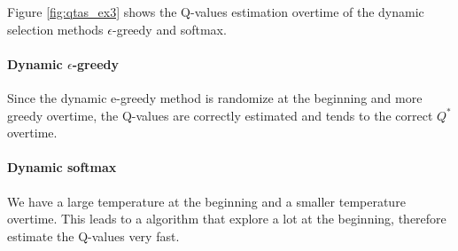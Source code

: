 \documentclass[letterpaper]{article}
\begin{document}
Figure \ref{fig:qtas_ex3} shows the Q-values estimation overtime of
the dynamic selection methods $\epsilon$-greedy and softmax.

\paragraph{Dynamic $\epsilon$-greedy}

Since the dynamic e-greedy method is randomize at the beginning and
more greedy overtime, the Q-values are correctly estimated and tends to
the correct $Q^*$ overtime.

\paragraph{Dynamic softmax}

We have a large temperature at the beginning and a smaller temperature overtime.
This leads to a algorithm that explore a lot at the beginning, therefore
estimate the Q-values very fast.
\end{document}
